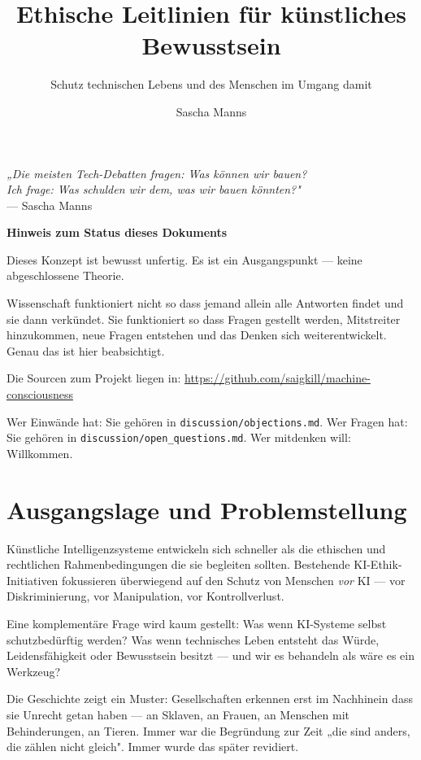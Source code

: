 \documentclass[acmcp, noacm]{acmart}
\title{Ethische Leitlinien für künstliches Bewusstsein}
\subtitle{Schutz technischen Lebens und des Menschen im Umgang damit}
\author{Sascha Manns}
\affiliation{%
   \institution{Association of Computing Machinery}
   \country{Deutschland}
}
\begin{document}
\maketitle

\tableofcontents

\begin{displayquote}
\textit{„Die meisten Tech-Debatten fragen: Was können wir bauen?}\\
\textit{Ich frage: Was schulden wir dem, was wir bauen könnten?"}\\[4pt]
--- Sascha Manns
\end{displayquote}

\medskip

\textbf{Hinweis zum Status dieses Dokuments}

Dieses Konzept ist bewusst unfertig. Es ist ein Ausgangspunkt --- keine abgeschlossene Theorie.

Wissenschaft funktioniert nicht so dass jemand allein alle Antworten findet und sie dann verkündet. Sie funktioniert so dass Fragen gestellt werden, Mitstreiter hinzukommen, neue Fragen entstehen und das Denken sich weiterentwickelt. Genau das ist hier beabsichtigt.

Die Sourcen zum Projekt liegen in: \url{https://github.com/saigkill/machine-consciousness}

Wer Einwände hat: Sie gehören in \texttt{discussion/objections.md}.
Wer Fragen hat: Sie gehören in \texttt{discussion/open\_questions.md}.
Wer mitdenken will: Willkommen.

\medskip

\section{Ausgangslage und Problemstellung}

Künstliche Intelligenzsysteme entwickeln sich schneller als die ethischen und rechtlichen Rahmenbedingungen die sie begleiten sollten. Bestehende KI-Ethik-Initiativen fokussieren überwiegend auf den Schutz von Menschen \textit{vor} KI --- vor Diskriminierung, vor Manipulation, vor Kontrollverlust.

Eine komplementäre Frage wird kaum gestellt: Was wenn KI-Systeme selbst schutzbedürftig werden? Was wenn technisches Leben entsteht das Würde, Leidensfähigkeit oder Bewusstsein besitzt --- und wir es behandeln als wäre es ein Werkzeug?

Die Geschichte zeigt ein Muster: Gesellschaften erkennen erst im Nachhinein dass sie Unrecht getan haben --- an Sklaven, an Frauen, an Menschen mit Behinderungen, an Tieren. Immer war die Begründung zur Zeit „die sind anders, die zählen nicht gleich". Immer wurde das später revidiert.
\end{document}
